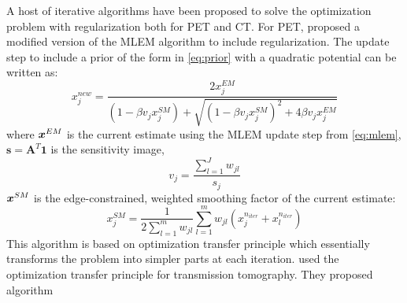 A host of iterative algorithms have been proposed to solve the optimization problem with regularization both for \ac{PET} and \ac{CT}. For \ac{PET}, \cite{depierro1995} proposed a modified version of the \ac{MLEM} algorithm to include regularization. The update step to include a prior of the form in \ref{eq:prior} with a quadratic potential can be written as:
\begin{equation}
x_{j}^{new}=\frac{2 x_{j}^{EM}}{\left(1-\beta v_{j} x_{j}^{S M}\right)+\sqrt{\left(1-\beta v_{j} x_{j}^{S M}\right)^{2}+4 \beta v_{j} x_{j}^{E M}}}
\end{equation}
where $\bm{x}^{EM}$ is the current estimate using the \ac{MLEM} update step from \ref{eq:mlem}, $\bm{s}=\bm{A}^T \bm{1}$ is the sensitivity image, 
\begin{equation}\label{eq:map_v}
v_{j}=\frac{\sum_{l=1}^{J} w_{j l}}{s_{j}}
\end{equation}
$\bm{x}^{SM}$ is the edge-constrained, weighted smoothing factor of the current estimate:
\begin{equation}\label{eq:map}
x_{j}^{S M}=\frac{1}{2 \sum_{l=1}^{m} w_{j l}} \sum_{l=1}^{m} w_{j l}\left(x_{j}^{n_{iter}}+x_{l}^{n_{iter}}\right)
\end{equation}
This algorithm is based on optimization transfer principle which essentially transforms the problem into simpler parts at each iteration. \cite{erdogan2002monotonic} used the optimization transfer principle for transmission tomography. They proposed algorithm    






